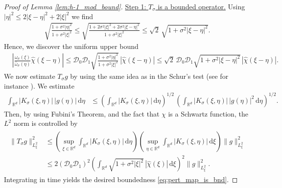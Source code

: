 \documentclass[reqno, 11pt]{amsart}
\numberwithin{equation}{section}
\theoremstyle{definition}
\begin{document}
\begin{proof}[Proof of Lemma \ref{lem:h-1_mod_bound}]
    \underline{Step 1: $T_\sigma$ is a bounded operator.}
    Using $|\eta|^2\leq 2|\xi-\eta|^2+2|\xi|^2$ we find
    \begin{align}
        \label{eq:bnd_ration_xi_eta}
        \sqrt{\frac{1+\sigma^2|\eta|^2}{1+\sigma^2|\xi|^2}}
        \leq \sqrt{\frac{1+2\sigma^2|\xi|^2+2\sigma^2|\xi-\eta|^2}{1+\sigma^2|\xi|^2}}
        \leq \sqrt{2}\,\sqrt{1+\sigma^2|\xi-\eta|^2}.
    \end{align}
    Hence, we discover the uniform upper bound
    \begin{align*}
        &\left|\frac{\hat{\omega}_\sigma(\xi)}{\hat{\omega}_\sigma(\eta)}\hat{\chi}(\xi-\eta)\right|
        \leq \mathcal{D}_0\mathcal{D}_1\sqrt{\frac{1+\sigma^2|\eta|^2}{1+\sigma^2|\xi|^2}}\,|\hat{\chi}(\xi-\eta)|
        \leq \sqrt{2}\,\mathcal{D}_0\mathcal{D}_1\sqrt{1+\sigma^2|\xi-\eta|^2}\,|\hat{\chi}(\xi-\eta)|.
    \end{align*}
    We now estimate $T_{\sigma} g$ by using the same idea as in the Schur's test (see for instance \cite[Theorem 5.2]{halmos_sunder_2012_bounded}). We estimate
    \begin{align}
        \label{eq:TK_bounded_op_1}
        \int_{\mathbb{R}^{d}} |K_\sigma(\xi,\eta)|\, |g(\eta)| \,\mathrm{d} \eta
        &\leq \left(\int_{\mathbb{R}^{d}} |K_\sigma(\xi,\eta)| \,\mathrm{d} \eta \right)^{1/2}\, \left(\int_{\mathbb{R}^{d}} |K_\sigma(\xi,\eta)|\, |g(\eta)|^2 \,\mathrm{d} \eta \right)^{1/2}.
    \end{align}
    Then, by using Fubini's Theorem, and the fact that $\mathcal{\chi}$ is a Schwartz function, the $L^2$ norm is controlled by
    \begin{align}
        \label{eq:TK_bounded_op_2}
        \begin{split}
            \|T_{\sigma}g\|^2_{L^2_{\xi}}
            &\leq \left(\sup_{\xi \in \mathbb{R}^{d}} \int_{\mathbb{R}^{d}} |K_{\sigma}(\xi,\eta)| \,\mathrm{d} \eta \right) \left(\sup_{\eta \in \mathbb{R}^{d}} \int_{\mathbb{R}^{d}} |K_{\sigma}(\xi,\eta)| \,\mathrm{d} \xi \right) \|g\|^2_{L^2_{\xi}}\\
            &\leq 2(\mathcal{D}_0\mathcal{D}_1)^2\left(\int_{\mathbb{R}^{d}}\sqrt{1+\sigma^2|\xi|^2}\,|\hat{\chi}(\xi)|\,\mathrm{d} \xi\right)^2
            \|g\|^2_{L^2_{\xi}}.
        \end{split}
    \end{align}
    Integrating in time yields the desired boundedness \eqref{eq:pert_map_is_bnd}.
    

\end{proof}
\end{document}
